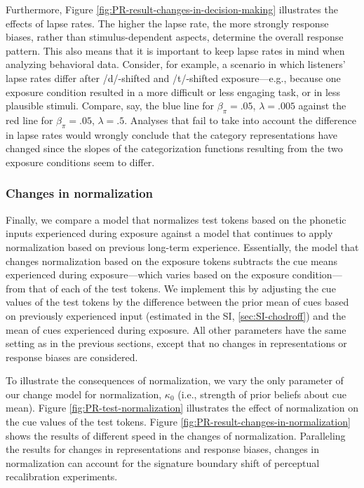 \documentclass[
  11pt,
  man,floatsintext]{apa6}
\begin{document}
Furthermore, Figure \ref{fig:PR-result-changes-in-decision-making} illustrates the effects of lapse rates. The higher the lapse rate, the more strongly response biases, rather than stimulus-dependent aspects, determine the overall response pattern. This also means that it is important to keep lapse rates in mind when analyzing behavioral data. Consider, for example, a scenario in which listeners' lapse rates differ after /d/-shifted and /t/-shifted exposure---e.g., because one exposure condition resulted in a more difficult or less engaging task, or in less plausible stimuli. Compare, say, the blue line for \(\beta_{\pi} = .05\), \(\lambda = .005\) against the red line for \(\beta_{\pi} = .05\), \(\lambda = .5\). Analyses that fail to take into account the difference in lapse rates would wrongly conclude that the category representations have changed since the slopes of the categorization functions resulting from the two exposure conditions seem to differ.

\hypertarget{changes-in-normalization}{%
\subsubsection{Changes in normalization}\label{changes-in-normalization}}

Finally, we compare a model that normalizes test tokens based on the phonetic inputs experienced during exposure against a model that continues to apply normalization based on previous long-term experience. Essentially, the model that changes normalization based on the exposure tokens subtracts the cue means experienced during exposure---which varies based on the exposure condition---from that of each of the test tokens. We implement this by adjusting the cue values of the test tokens by the difference between the prior mean of cues based on previously experienced input (estimated in the SI, \ref{sec:SI-chodroff}) and the mean of cues experienced during exposure. All other parameters have the same setting as in the previous sections, except that no changes in representations or response biases are considered.

To illustrate the consequences of normalization, we vary the only parameter of our change model for normalization, \(\kappa_0\) (i.e., strength of prior beliefs about cue mean). Figure \ref{fig:PR-test-normalization} illustrates the effect of normalization on the cue values of the test tokens. Figure \ref{fig:PR-result-changes-in-normalization} shows the results of different speed in the changes of normalization. Paralleling the results for changes in representations and response biases, changes in normalization can account for the signature boundary shift of perceptual recalibration experiments.
\end{document}
